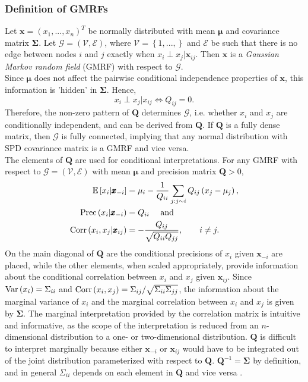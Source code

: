 \subsubsection{Definition of GMRFs}
Let $\pmb{x}=\left(x_1,...,x_n\right)^T$ be normally distributed with mean $\pmb{\mu}$ and covariance matrix $\pmb{\Sigma}$. Let $\mathcal{G}=\left(\mathcal{V}, \mathcal{E}\right)$, where $\mathcal{V}=\left\lbrace 1,...,\right\rbrace$ and $\mathcal{E}$ be such that there is no edge between nodes $i$ and $j$ exactly when $x_i\perp x_j|\pmb{x}_{ij}$. Then $\pmb{x}$ is a \textit{Gaussian Markov random field} (GMRF) with respect to $\mathcal{G}$. \\
Since $\pmb{\mu}$ does not affect the pairwise conditional independence properties of $\pmb{x}$, this information is 'hidden' in $\pmb{\Sigma}$. Hence,
\begin{equation*}
    x_i\perp x_j|x_{ij}\Longleftrightarrow Q_{ij}=0.
\end{equation*}
Therefore, the non-zero pattern of $\pmb{Q}$ determines $\mathcal{G}$, i.e. whether $x_i$ and $x_j$ are conditionally independent, and can be derived from $\pmb{Q}$. If $\pmb{Q}$ is a fully dense matrix, then $\mathcal{G}$ is fully connected, implying that any normal distribution with SPD covariance matrix is a GMRF and vice versa. \\
The elements of $\pmb{Q}$ are used for conditional interpretations. For any GMRF with respect to $\mathcal{G}=\left(\mathcal{V}, \mathcal{E}\right)$ with mean $\pmb{\mu}$ and precision matrix $\pmb{Q} > 0$,
\begin{align}
    \mathbb{E}\left[x_i|\pmb{x}_{-i}\right] &= \mu_i-\frac{1}{Q_{ii}}\sum_{j:j\sim i}Q_{ij}\left(x_j-\mu_j\right), \label{eq:mean_gmrf}\\
    \hbox{Prec}\left(x_i|\pmb{x}_{-i}\right) &= Q_{ii} \hspace{10pt}\hbox{ and }\label{eq:prec_gmrf}\\
    \hbox{Corr}\left(x_i,x_j|\pmb{x}_{ij}\right) &= -\frac{Q_{ij}}{\sqrt{Q_{ii}Q_{jj}}},\hspace{20pt} i\neq j.
\end{align}
On the main diagonal of $\pmb{Q}$ are the conditional precisions of $x_i$ given $\pmb{x}_{-i}$ are placed, while the other elements, when scaled appropriately, provide information about the conditional correlation between $x_i$ and $x_j$ given $\pmb{x}_{ij}$. Since $\hbox{Var}\left(x_i\right)=\Sigma_{ii}$ and $\hbox{Corr}\left(x_i,x_j\right)=\Sigma_{ij}/\sqrt{\Sigma_{ii}\Sigma_{jj}}$, the information about the marginal variance of $x_i$ and the marginal correlation between $x_i$ and $x_j$ is given by $\pmb{\Sigma}$. The marginal interpretation provided by the correlation matrix is intuitive and informative, as the scope of the interpretation is reduced from an $n$-dimensional distribution to a one- or two-dimensional distribution. $\pmb{Q}$ is difficult to interpret marginally because either $\pmb{x}_{-i}$ or $\pmb{x}_{ij}$ would have to be integrated out of the joint distribution parameterized with respect to $\pmb{Q}$. $\pmb{Q}^{-1}=\pmb{\Sigma}$ by definition, and in general $\Sigma_{ii}$ depends on each element in $\pmb{Q}$ and vice versa \autocite[][20--23]{rue2005gaussian}.
